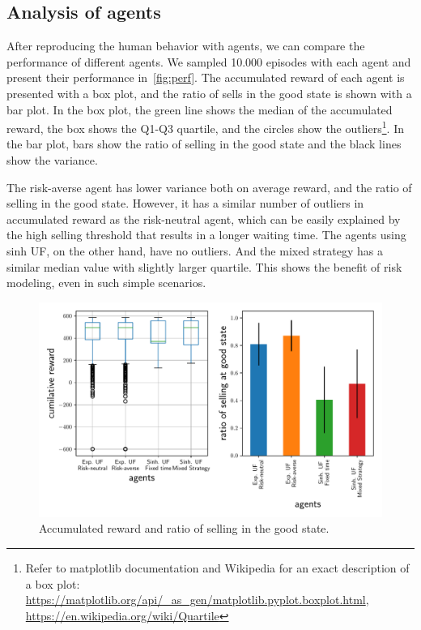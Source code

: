 \subsection{Analysis of agents}
After reproducing the human behavior with agents, we can compare the performance of different agents.
We sampled 10.000 episodes with each agent and present their performance in~\autoref{fig:perf}. The accumulated reward of each agent is presented with a box plot, and the ratio of sells in the good state is shown with a bar plot. 
In the box plot, the green line shows the median of the accumulated reward, the box shows the Q1-Q3 quartile, and the circles show the outliers\footnote{Refer to matplotlib documentation and Wikipedia for an exact description of a box plot: \url{https://matplotlib.org/api/_as_gen/matplotlib.pyplot.boxplot.html}, \url{https://en.wikipedia.org/wiki/Quartile}}.
In the bar plot, bars show the ratio of selling in the good state and the black lines show the variance.

The risk-averse agent has lower variance both on average reward, and the ratio of selling in the good state. However, it has a similar number of outliers in accumulated reward as the risk-neutral agent, which can be easily explained by the high selling threshold that results in a longer waiting time. The agents using sinh UF, on the other hand, have no outliers. And the mixed strategy has a similar median value with slightly larger quartile.
This shows the benefit of risk modeling, even in such simple scenarios.

\begin{figure}[h]
    \centering
    \includegraphics[width=0.99\linewidth]{img/performance.pdf}
    \caption{Accumulated reward and ratio of selling in the good state.}\label{fig:perf}
\end{figure}
